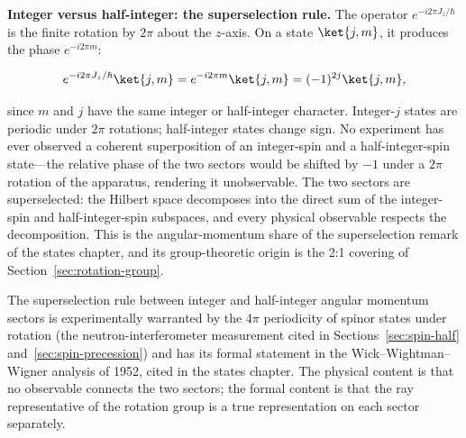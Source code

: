 \medskip\noindent\textbf{Integer versus half-integer: the superselection rule.} The operator $e^{-i2\pi J_z/\hbar}$ is the finite rotation by $2\pi$ about the $z$-axis. On a state $\ket{j,m}$, it produces the phase $e^{-i2\pi m}$:
\begin{linenomath}
    \begin{equation}
        e^{-i2\pi J_z/\hbar}\ket{j,m} = e^{-i2\pi m}\ket{j,m} = (-1)^{2j}\ket{j,m},
    \end{equation}
\end{linenomath}
since $m$ and $j$ have the same integer or half-integer character. Integer-$j$ states are periodic under $2\pi$ rotations; half-integer states change sign. No experiment has ever observed a coherent superposition of an integer-spin and a half-integer-spin state---the relative phase of the two sectors would be shifted by $-1$ under a $2\pi$ rotation of the apparatus, rendering it unobservable. The two sectors are superselected: the Hilbert space decomposes into the direct sum of the integer-spin and half-integer-spin subspaces, and every physical observable respects the decomposition. This is the angular-momentum share of the superselection remark of the states chapter, and its group-theoretic origin is the 2:1 covering of Section~\ref{sec:rotation-group}.

\begin{note}
    The superselection rule between integer and half-integer angular momentum sectors is experimentally warranted by the $4\pi$ periodicity of spinor states under rotation (the neutron-interferometer measurement cited in Sections~\ref{sec:spin-half} and~\ref{sec:spin-precession}) and has its formal statement in the Wick--Wightman--Wigner analysis of 1952, cited in the states chapter. The physical content is that no observable connects the two sectors; the formal content is that the ray representative of the rotation group is a true representation on each sector separately.
\end{note}

